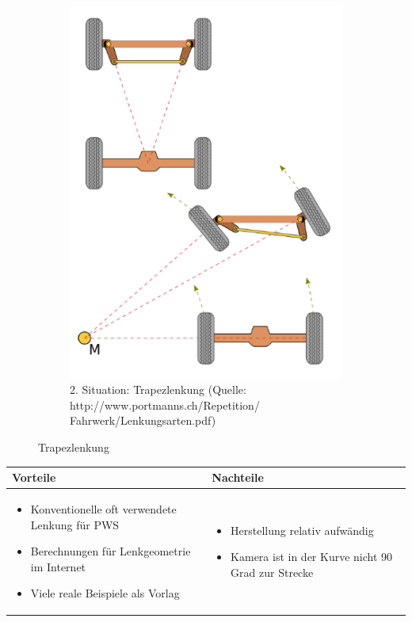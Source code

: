 \begin{figure} [hbp]
\begin{subfigure}[b]{0.36\textwidth}
		\includegraphics[width=\textwidth]{fig/Lenktrapez.png}
		\caption{2. Situation: Trapezlenkung
		(Quelle: http://www.portmanns.ch/Repetition/ \\
		Fahrwerk/Lenkungsarten.pdf)}
\end{subfigure}
	\caption{Trapezlenkung}\label{fig:animals}
\end{figure}

\begin{table}[h]
\begin{tabular}{p{} | p{}}


 \textbf{Vorteile} & \textbf{Nachteile} \\ \hline
	 
\begin{itemize}
\item Konventionelle oft verwendete Lenkung für PWS
\item Berechnungen für Lenkgeometrie im Internet
\item Viele reale Beispiele als Vorlag
\end{itemize}

 
 &
 
\begin{itemize}
\item Herstellung relativ aufwändig
\item Kamera ist in der Kurve nicht 90 Grad zur Strecke
\end{itemize}

\end{tabular}
\end{table}

